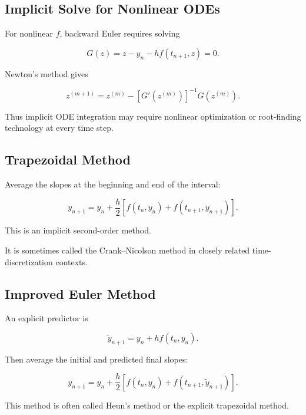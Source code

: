 \subsection{Implicit Solve for Nonlinear ODEs}
\label{subsec:implicit-nonlinear-ode-solve}

For nonlinear \(f\), backward Euler requires solving

\[
\boxed{
G(z)
=
z-y_n-hf(t_{n+1},z)
=
0.
}
\]

Newton's method gives

\[
\boxed{
z^{(m+1)}
=
z^{(m)}
-
[
G'(z^{(m)})
]^{-1}
G(z^{(m)}).
}
\]

Thus implicit ODE integration may require nonlinear optimization or
root-finding technology at every time step.

\subsection{Trapezoidal Method}
\label{subsec:ode-trapezoidal-method}

Average the slopes at the beginning and end of the interval:

\[
\boxed{
y_{n+1}
=
y_n
+
\frac{h}{2}
\left[
f(t_n,y_n)
+
f(t_{n+1},y_{n+1})
\right].
}
\]

This is an implicit second-order method.

It is sometimes called the Crank--Nicolson method in closely related
time-discretization contexts.

\subsection{Improved Euler Method}
\label{subsec:improved-euler}

An explicit predictor is

\[
\boxed{
\widetilde{y}_{n+1}
=
y_n
+
hf(t_n,y_n).
}
\]

Then average the initial and predicted final slopes:

\[
\boxed{
y_{n+1}
=
y_n
+
\frac{h}{2}
\left[
f(t_n,y_n)
+
f(t_{n+1},\widetilde{y}_{n+1})
\right].
}
\]

This method is often called Heun's method or the explicit trapezoidal
method.

